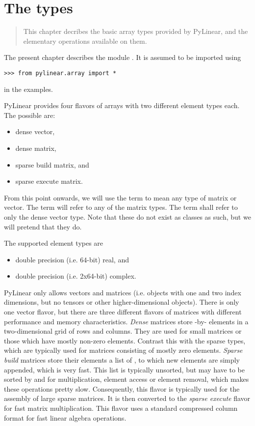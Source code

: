 \chapter{The  types}
\begin{quote}
   This chapter decribes the basic array types provided by PyLinear, and
   the elementary operations available on them.
\end{quote}

The present chapter describes the module . It is
assumed to be imported using
\begin{verbatim}
>>> from pylinear.array import *
\end{verbatim}
in the examples.

PyLinear provides four flavors of arrays with two different element
types each.  The possible  are:
\begin{itemize}
  \item dense vector,
  \item dense matrix,
  \item sparse build matrix, and
  \item sparse execute matrix.
\end{itemize}
From this point onwards, we will use the term 
to mean any type of matrix or vector. The term 
will refer to any of the matrix types. The term 
shall refer to only the dense vector type. Note that these do not exist as
classes as such, but we will pretend that they do.

The supported element types are
\begin{itemize}
  \item double precision (i.e. 64-bit) real, and
  \item double precision (i.e. 2x64-bit) complex.
\end{itemize}

PyLinear only allows vectors and matrices (i.e.  objects with one and
two index dimensions, but no tensors or other higher-dimensional
objects). There is only one vector flavor, but there are three
different flavors of matrices with different performance and memory
characteristics. \emph{Dense} matrices store -by-
elements in a two-dimensional grid of  rows and 
columns. They are used for small matrices or those which have mostly
non-zero elements. Contrast this with the sparse types, which are
typically used for matrices consisting of mostly zero
elements. \emph{Sparse build} matrices store their elements a list of
, to which new elements are simply appended,
which is very fast. This list is typically unsorted, but may have to
be sorted by  and  for multiplication, element access or
element removal, which makes these operations pretty
slow. Consequently, this flavor is typically used for the assembly of
large sparse matrices. It is then converted to the \emph{sparse
execute} flavor for fast matrix multiplication. This flavor uses a
standard compressed column format for fast linear algebra operations.

